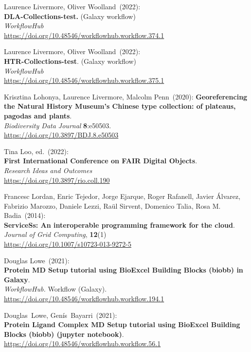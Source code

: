 \begin{thebibliography}{9}
Laurence Livermore, Oliver Woolland~(2022): \\
\textbf{DLA-Collections-test.} (Galaxy workflow)\\
\emph{WorkflowHub}\\
\url{https://doi.org/10.48546/workflowhub.workflow.374.1}

Laurence Livermore, Oliver Woolland~(2022): \\
\textbf{HTR-Collections-test}. (Galaxy workflow)\\
\emph{WorkflowHub}\\
\url{https://doi.org/10.48546/workflowhub.workflow.375.1}

Krisztina Lohonya, Laurence Livermore, Malcolm Penn~(2020):
\textbf{Georeferencing the Natural History Museum's Chinese type collection: of plateaus,
pagodas and plants}.\\
\emph{Biodiversity Data Journal} \textbf{8}:e50503.\\
\url{https://doi.org/10.3897/BDJ.8.e50503}


Tina Loo, ed.~(2022): \\
\textbf{First International Conference on FAIR Digital Objects}.\\
\emph{Research Ideas and Outcomes}\\
\url{https://doi.org/10.3897/rio.coll.190}

Francesc Lordan, Enric Tejedor, Jorge Ejarque, Roger
Rafanell, Javier Álvarez, Fabrizio Marozzo, Daniele Lezzi, Raül Sirvent,
Domenico Talia, Rosa M. Badia~(2014): \\
\textbf{ServiceSs: An interoperable programming framework for the
cloud}.\\
\emph{Journal of Grid Computing}, \textbf{12}(1)\\
\url{https://doi.org/10.1007/s10723-013-9272-5}

Douglas Lowe~(2021): \\
\textbf{Protein MD Setup tutorial using BioExcel Building Blocks (biobb)
in Galaxy}.\\
\emph{WorkflowHub.} Workflow (Galaxy).\\
\url{https://doi.org/10.48546/workflowhub.workflow.194.1}

Douglas~Lowe, Genís~Bayarri~(2021): \\
\textbf{Protein Ligand Complex MD Setup tutorial using BioExcel Building
Blocks (biobb) (jupyter notebook)}.\\
\url{https://doi.org/10.48546/workflowhub.workflow.56.1}


\end{thebibliography}
